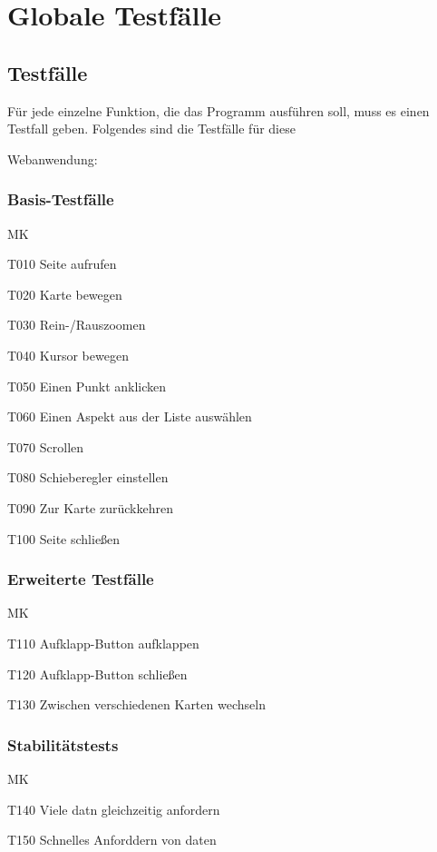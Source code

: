 \section{Globale Testfälle}
\subsection{Testfälle}
\setcounter{counter}{10}

Für jede einzelne Funktion, die das Programm ausführen soll, muss es einen Testfall geben. Folgendes sind die Testfälle für diese 

Webanwendung:
\subsubsection{Basis-Testfälle}
\begin{Kriterien}{MK}

	\item[T010] Seite aufrufen

	\item[T020] Karte bewegen
	
	
	\item[T030] Rein-/Rauszoomen
	
	\item[T040] Kursor bewegen
	
	\item[T050] Einen Punkt anklicken
	
	\item[T060] Einen Aspekt aus der Liste auswählen
	
	\item[T070] Scrollen
	
	\item[T080] Schieberegler einstellen
	
	\item[T090] Zur Karte zurückkehren
	
	\item[T100] Seite schließen
\end{Kriterien}
\subsubsection{Erweiterte Testfälle}
\begin{Kriterien}{MK}

	\item[T110] Aufklapp-Button aufklappen

	\item[T120]  Aufklapp-Button schließen
	
	\item[T130] Zwischen verschiedenen Karten wechseln
	
\end{Kriterien}
\subsubsection{Stabilitätstests}
\begin{Kriterien}{MK}

	\item[T140] Viele datn gleichzeitig anfordern

	\item[T150] Schnelles Anforddern von daten
	
\end{Kriterien}
